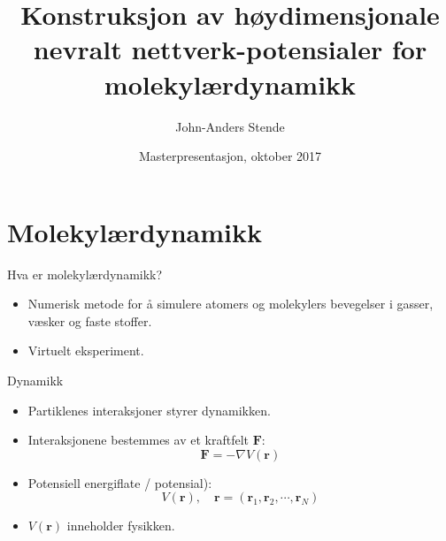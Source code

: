 \documentclass{beamer}
\title{Konstruksjon av høydimensjonale nevralt nettverk-potensialer for molekylærdynamikk}
\author{John-Anders Stende}
\institute{
  Fysisk institutt \\
  Universitetet i Oslo
}
\date{Masterpresentasjon, oktober 2017}
\begin{document}
\frame{\titlepage}

\begin{frame}

\tableofcontents

\end{frame}


\section{Molekylærdynamikk}


\begin{frame}

\begin{block}{Hva er molekylærdynamikk?}
  \begin{itemize}
  \item Numerisk metode for å simulere atomers og molekylers bevegelser i gasser, væsker og faste stoffer.
  \item Virtuelt eksperiment.
  \end{itemize}
\end{block}

\end{frame}


\begin{frame}

\begin{block}{Dynamikk}
  \begin{itemize}
  \item Partiklenes interaksjoner styrer dynamikken.
  \item Interaksjonene bestemmes av et kraftfelt $\mathbf{F}$:
    \begin{equation*}
    \mathbf{F} = -\nabla V(\mathbf{r})
    \end{equation*}
  \item Potensiell energiflate / potensial):
    \begin{equation*}
      V(\mathbf{r}), \quad \mathbf{r} = (\mathbf{r}_1, \mathbf{r}_2, \cdots, \mathbf{r}_N)
    \end{equation*}
  \item $V(\mathbf{r})$ inneholder fysikken. 
  \end{itemize}
\end{block}

\end{frame}
\end{document}
